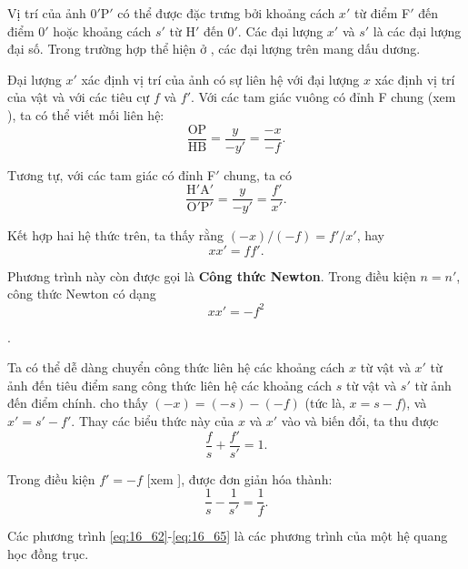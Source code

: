 Vị trí của ảnh $0'$P$'$ có thể được đặc trưng bởi khoảng cách $x'$ từ điểm F$'$ đến điểm $0'$ hoặc khoảng cách $s'$ từ H$'$ đến $0'$.
Các đại lượng $x'$ và $s'$ là các đại lượng đại số.
Trong trường hợp thể hiện ở , các đại lượng trên mang dấu dương.

Đại lượng $x'$ xác định vị trí của ảnh có sự liên hệ với đại lượng $x$ xác định vị trí của vật và với các tiêu cự $f$ và $f'$.
Với các tam giác vuông có đỉnh F chung (xem ), ta có thể viết mối liên hệ:
\begin{equation}\label{eq:16_60}
    \frac{\text{OP}}{\text{HB}} = \frac{y}{-y'} = \frac{-x}{-f}.
\end{equation}

\noindent
Tương tự, với các tam giác có đỉnh F$'$ chung, ta có
\begin{equation}\label{eq:16_61}
    \frac{\text{H$'$A$'$}}{\text{O$'$P$'$}} = \frac{y}{-y'} = \frac{f'}{x'}.
\end{equation}

\noindent
Kết hợp hai hệ thức trên, ta thấy rằng $(-x)/(-f)=f'/x'$, hay
\begin{equation}\label{eq:16_62}
    xx' = ff'.
\end{equation}

\noindent
Phương trình này còn được gọi là \textbf{Công thức Newton}.
Trong điều kiện $n = n'$, công thức Newton có dạng
\begin{equation}\label{eq:16_63}
    xx' = -f^2
\end{equation}

.

Ta có thể dễ dàng chuyển công thức liên hệ các khoảng cách $x$ từ vật và $x'$ từ ảnh đến tiêu điểm sang công thức liên hệ các khoảng cách $s$ từ vật và $s'$ từ ảnh đến điểm chính.
 cho thấy $(-x) = (-s) - (-f)$ (tức là, $x=s-f$), và $x'=s'-f'$.
Thay các biểu thức này của $x$ và $x'$ vào  và biến đổi, ta thu được
\begin{equation}\label{eq:16_64}
    \frac{f}{s} + \frac{f'}{s'} = 1.
\end{equation}

\noindent
Trong điều kiện $f'=-f$ [xem ],  được đơn giản hóa thành:
\begin{equation}\label{eq:16_65}
    \frac{1}{s} - \frac{1}{s'} = \frac{1}{f}.
\end{equation}

\noindent
Các phương trình \eqref{eq:16_62}-\eqref{eq:16_65} là các phương trình của một hệ quang học đồng trục.

